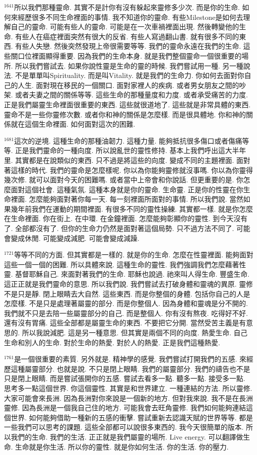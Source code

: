 \documentclass{book}
\begin{document}
$^{1641}$所以我們那種靈命.
其實不是計你有沒有躲起來靈修多少次.
而是你的生命.
如何來經歷很多不同生命裡面的事情.
我不知道你的靈命.
有些Milestone是如何去理解自己的靈命.
可能有些人的靈命.
可能是在一次車禍裡面出現.
然後轉變他的生命.
有些人在癌症裡面突然有很大的反省.
有些人寫過翻山書.
就有很多不同的東西.
有些人失戀.
然後突然發現上帝很需要等等.
我們的靈命永遠在我們的生命.
這些關口位裡面顯得重要.
因為我們的生命本身.
就是我們整個靈命一個很重要的場所.
所以我們嘗試去.
如果你說性靈是生命的靈的時候.
我們嘗試用一種.
另一種說法.
不是單單叫Spirituality.
而是叫Vitality.
就是我們的生命力.
你如何去面對你自己的人生.
面對現在移民的一個關口.
面對家裡人的疾病.
或者男女朋友之間的吵架.
或者夫妻之間的關係等等.
這些生命的那種量度和力度.
或者承受痛苦的力度.
正是我們屬靈生命裡面很重要的東西.
這些就很道地了.
這些就是非常具體的東西.
靈命不是一些你靈修次數.
或者你和神的關係是怎麼樣.
而是很具體地.
你和神的關係就在這個生命裡面.
如何面對這次的困難.

$^{1681}$這次的逆境.
這種生命的那種油韌力.
這種力量.
能夠抵抗很多傷口或者傷痛等等.
正是我們靈命的一種向度.
所以說亂世的靈性修持.
基本上我們呼出這大半年里.
其實都是在說類似的東西.
只不過是將這些的向度.
變成不同的主題裡面.
面對著這樣的時代.
我們的靈命是怎麼樣呢.
你以為你能夠靈修就沒事嗎.
你以為你靈得幾次修.
就可以面對今天的困難嗎.
或者當中上帝會和你說話.
但更重要的是.
你怎麼面對這個社會.
這種氣氛.
這種本身就是你的靈命.
生命靈.
正是你的性靈在你生命裡面.
怎麼能夠面對著你每一天.
每一刻裡面所面對的事情.
所以我們說.
當然如果幾年前我們在運動的期間裡面.
有很多不同的靈性操練.
其實都一樣.
就是你怎麼在生命裡面.
你在街上.
在中環.
在金鐘裡面.
怎麼能夠彰顯你的靈性.
到今天沒有了.
全部都沒有了.
但你的生命力仍然是面對著這個局勢.
只不過方法不同了.
可能會變成休閒.
可能變成減肥.
可能會變成減躁.

$^{1721}$等等不同的方面.
但其實都是一樣的.
就是你的生命.
怎麼在性靈裡面.
能夠面對這些一個一個的困難.
所以具體來說.
這種生命的靈性.
我們強調我們怎麼藉著性靈.
基督耶穌自己.
來面對著我們的生命.
耶穌也說過.
祂來叫人得生命.
豐盛生命.
這正正就是我們靈命的意思.
所以我們說.
我們嘗試去打破身體和靈魂的異原.
靈修不是只是靜.
閉上眼睛去大自然.
這些東西.
而是你整個的身體.
包括你自己的人是怎麼樣.
不是只是處理著屬靈的部分.
而是你整個人.
因為身體和靈魂是分不開的.
我們就不只是去陪一些屬靈部分的自己.
而是整個人.
你有沒有熬夜.
吃得好不好.
還有沒有胃痛.
這些全部都是屬靈生命的東西.
不要把它分開.
當然受苦主義是有意思的.
所以我說減肥.
這是另一種意思.
但其實是兩個不同的向度.
熱愛生命.
自己生命和別人的生命.
對於生命的熱愛.
對於人的熱愛.
正是我們這種熱愛.

$^{1761}$是一個很重要的素質.
另外就是.
精神學的感覺.
我們嘗試打開我們的五感.
來經歷這種屬靈部分.
也就是說.
不只是閉上眼睛.
我們的屬靈部分.
我們的禱告也不是只是閉上眼睛.
而是嘗試張開你的五感.
嘗試去看多一點.
聽多一點.
接受多一點.
思考多一點這個世界.
你這個靈性.
其實是和世界建立.
一種連結的方法.
所以靈修.
大家可能會來長洲.
因為長洲對你來說是一個新的地方.
但對我來說.
我不是在長洲靈修.
因為長洲是一個我自己住的地方.
可能我會去旺角靈修.
我們如何能夠連結這個世界.
如何能夠借助一種新的五感的衝擊.
嘗試重新去認識天賦的世界等等.
都是一些我們可以思考的課題.
這些全部都可以說很多東西的.
我今天很簡單的版本.
所以我們的生命.
我們的生活.
正正就是我們屬靈的場所.
Live energy.
可以翻譯做生命.
生命就是你生活.
所以你的靈性.
就是你如何生活.
你的生活.
你的壓力.
\end{document}
